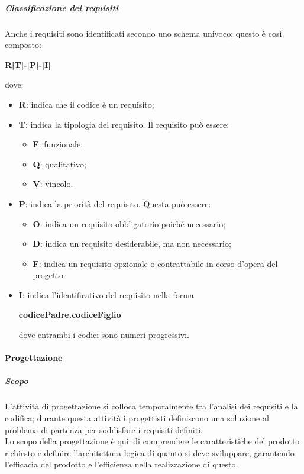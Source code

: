 \documentclass[../norme-di-progetto.tex]{subfiles}
\begin{document}
\subparagraph{Classificazione dei requisiti}
Anche i requisiti sono identificati secondo uno schema univoco; questo è così composto: \\
\begin{center}
  \centering
  \textbf{R[T]-[P]-[I]}
\end{center} dove:
\begin{itemize}
  \item \textbf{R}: indica che il codice è un requisito;
  \item \textbf{T}: indica la tipologia del requisito. Il requisito può essere:
  \begin{itemize}
    \item \textbf{F}: funzionale;
    \item \textbf{Q}: qualitativo;
    \item \textbf{V}: vincolo.
  \end{itemize}
  \item \textbf{P}: indica la priorità del requisito. Questa può essere:
  \begin{itemize}
    \item \textbf{O}: indica un requisito obbligatorio poiché necessario;
    \item \textbf{D}: indica un requisito desiderabile, ma non necessario;
    \item \textbf{F}: indica un requisito opzionale o contrattabile in corso d'opera del progetto.
  \end{itemize}
  \item \textbf{I}: indica l'identificativo del requisito nella forma \\
  \begin{center}
    \centering
    \textbf{codicePadre.codiceFiglio}
  \end{center} dove entrambi i codici sono numeri progressivi.
\end{itemize}


\paragraph{Progettazione}
\subparagraph{Scopo}
L'attività di progettazione si colloca temporalmente tra l'analisi dei requisiti e la codifica; durante questa attività i progettisti definiscono una soluzione al problema di partenza per soddisfare i requisiti definiti. \\
Lo scopo della progettazione è quindi comprendere le caratteristiche del prodotto richiesto e definire l'architettura logica di quanto si deve sviluppare, garantendo l'efficacia del prodotto e l'efficienza nella realizzazione di questo.
\end{document}

